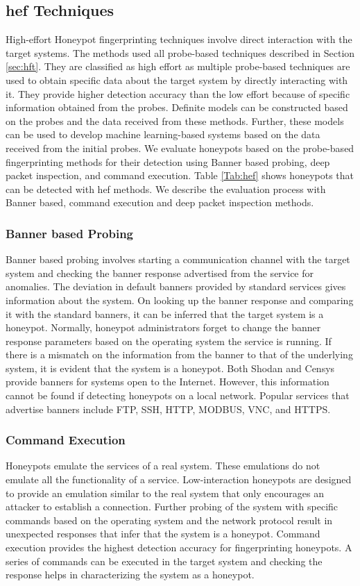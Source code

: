 \subsection{\acrfull{hef} Techniques}
High-effort Honeypot fingerprinting techniques involve direct interaction with the target systems. The methods used all probe-based techniques described in Section \ref{sec:hft}. They are classified as high effort as multiple probe-based techniques are used to obtain specific data about the target system by directly interacting with it. They provide higher detection accuracy than the low effort because of specific information obtained from the probes. Definite models can be constructed based on the probes and the data received from these methods. Further, these models can be used to develop machine learning-based systems based on the data received from the initial probes. We evaluate honeypots based on the probe-based fingerprinting methods for their detection using Banner based probing, deep packet inspection, and command execution. Table \ref{Tab:hef} shows honeypots that can be detected with \acrshort{hef} methods. We describe the evaluation process with Banner based, command execution and deep packet inspection methods. 

\subsubsection{Banner based Probing}
Banner based probing involves starting a communication channel with the target system and checking the banner response advertised from the service for anomalies. The deviation in default banners provided by standard services gives information about the system. On looking up the banner response and comparing it with the standard banners, it can be inferred that the target system is a honeypot. Normally, honeypot administrators forget to change the banner response parameters based on the operating system the service is running. If there is a mismatch on the information from the banner to that of the underlying system, it is evident that the system is a honeypot. Both Shodan and Censys provide banners for systems open to the Internet. However, this information cannot be found if detecting honeypots on a local network. Popular services that advertise banners include FTP, SSH, HTTP, MODBUS, VNC, and HTTPS. 


\subsubsection{Command Execution}
Honeypots emulate the services of a real system. These emulations do not emulate all the functionality of a service. Low-interaction honeypots are designed to provide an emulation similar to the real system that only encourages an attacker to establish a connection. Further probing of the system with specific commands based on the operating system and the network protocol result in unexpected responses that infer that the system is a honeypot. Command execution provides the highest detection accuracy for fingerprinting honeypots. A series of commands can be executed in the target system and checking the response helps in characterizing the system as a honeypot. 



